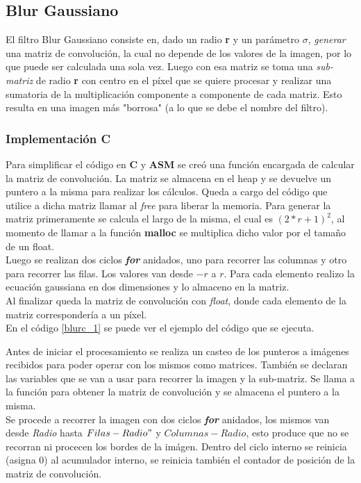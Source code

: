 \subsection{Blur Gaussiano}
El filtro Blur Gaussiano consiste en, dado un radio \textbf{r} y un par\'ametro $\sigma$, \emph{generar} una matriz de convoluci\'on, la cual no depende de los valores de la imagen, por lo que puede ser calculada una sola vez. Luego con esa matriz se toma una \emph{sub-matriz} de radio \textbf{r} con centro en el p\'ixel que se quiere procesar y realizar una sumatoria de la multiplicaci\'on componente a componente de cada matriz. Esto resulta en una imagen m\'as "borrosa" (a lo que se debe el nombre del filtro).

\subsubsection{Implementaci\'on C}
\label{sec:blur_impc}
Para simplificar el c\'odigo en \textbf{C} y \textbf{ASM} se cre\'o  una funci\'on encargada de calcular la matriz de convoluci\'on. La matriz se almacena en el heap y se devuelve un puntero a la misma para realizar los c\'alculos. Queda a cargo del c\'odigo que utilice a dicha matriz llamar al \emph{free} para liberar la memoria.
Para generar la matriz primeramente se calcula el largo de la misma, el cual es $(2*r + 1)^2$, al momento de llamar a la funci\'on \textbf{malloc} se multiplica dicho valor por el tama\~no de un float. \\
Luego se realizan dos ciclos \textbf{\emph{for}} anidados, uno para recorrer las columnas y otro para recorrer las filas. Los valores van desde $-r$ a $r$. Para cada elemento realizo la ecuaci\'on gaussiana en dos dimensiones y lo almaceno en la matriz. \\
Al finalizar queda la matriz de convoluci\'on con \emph{float}, donde cada elemento de la matriz corresponder\'ia a un p\'ixel. \\
En el c\'odigo \ref{blurc_1} se puede ver el ejemplo del código que se ejecuta.

Antes de iniciar el procesamiento se realiza un casteo de los punteros a im\'agenes recibidos para poder operar con los mismos como matrices. Tambi\'en se declaran las variables que se van a usar para recorrer la imagen y la sub-matriz. Se llama a la funci\'on para obtener la matriz de convoluci\'on y se almacena el puntero a la misma.\\
Se procede a recorrer la imagen con dos ciclos \textbf{\emph{for}} anidados, los mismos van desde \emph{Radio} hasta $Filas-Radio"$ y $Columnas-Radio$, esto produce que no se recorran ni procecen los bordes de la im\'agen.
Dentro del ciclo interno se reinicia (asigna $0$) al acumulador interno, se reinicia tambi\'en el contador de posici\'on de la matriz de convoluci\'on.

